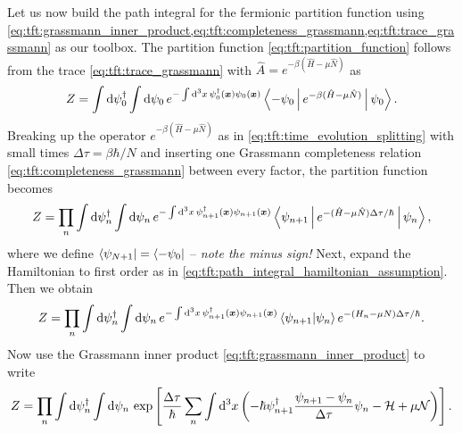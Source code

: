 Let us now build  the path integral for the fermionic partition function using \cref{eq:tft:grassmann_inner_product,eq:tft:completeness_grassmann,eq:tft:trace_grassmann} as our toolbox. 
The partition function \eqref{eq:tft:partition_function} follows from the trace \eqref{eq:tft:trace_grassmann} with $\hat{A} = e^{-\beta (\hat{H} - \mu \hat{N})}$ as
\begin{equation}
	Z = \int \mathop{}\!\mathrm{d} \psi_0^\dagger \int \mathop{}\!\mathrm{d} \psi_0 \, e^{-\int \mathop{}\!\mathrm{d}^3 x \, \psi_{0}^\dagger({\bm{x}}) \psi_{0}({\bm{x}})} \Braket{-\psi_0 | e^{-\beta(\hat{H} - \mu \hat{N})} | \psi_0} .
\label{eq:tft:fermion_path_integral_after_completeness}
\end{equation}
Breaking up the operator $e^{-\beta (\hat{H} - \mu \hat{N})}$ as in \cref{eq:tft:time_evolution_splitting} with small times $\Delta \tau = \beta \hbar / N$ and inserting one Grassmann completeness relation \eqref{eq:tft:completeness_grassmann} between every factor, the partition function becomes
\begin{equation}
	Z = \prod_n \int \mathop{}\!\mathrm{d} \psi_n^\dagger \int \mathop{}\!\mathrm{d} \psi_n \, e^{-\int \mathop{}\!\mathrm{d}^3 x \, \psi_{n+1}^\dagger({\bm{x}}) \psi_{n+1}({\bm{x}})} \Braket{\psi_{n+1} | e^{-(\hat{H} - \mu \hat{N}) \Delta \tau / \hbar} | \psi_n} ,
\end{equation}
where we define $\bra{\psi_{N+1}} = \bra{-\psi_0}$ -- \emph{note the minus sign!}
Next, expand the Hamiltonian to first order as in \cref{eq:tft:path_integral_hamiltonian_assumption}.
Then we obtain
\begin{equation}
	Z = \prod_n \int \mathop{}\!\mathrm{d} \psi_n^\dagger \int \mathop{}\!\mathrm{d} \psi_n \, e^{-\int \mathop{}\!\mathrm{d}^3 x \, \psi_{n+1}^\dagger({\bm{x}}) \psi_{n+1}({\bm{x}})} \braket{\psi_{n+1} | \psi_n} e^{-(H_n - \mu N) \Delta \tau / \hbar} .
\end{equation}
Now use the Grassmann inner product \eqref{eq:tft:grassmann_inner_product} to write
\begin{equation}
	Z = \prod_n \int \mathop{}\!\mathrm{d} \psi_n^\dagger \int \mathop{}\!\mathrm{d} \psi_n \, \exp \left[ \frac{\Delta \tau}{\hbar} \sum_n \int \mathop{}\!\mathrm{d}^3 x \left( -\hbar \psi^\dagger_{n+1} \frac{\psi_{n+1} - \psi_n}{\Delta \tau} \psi_{n} - \mathcal{H} + \mu \mathcal{N} \right) \right] .
\end{equation}

